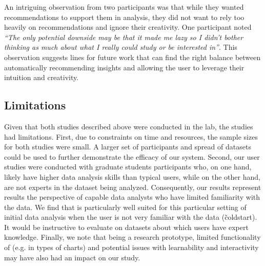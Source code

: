 An intriguing observation from two participants was that while they wanted recommendations to support them
in analysis, they did not want to rely too heavily on recommendations and ignore their creativity.
One participant noted {\em ``The only potential downside may be that it made 
me lazy so I didn't bother thinking as much about what I really could study or be interested in''}.
This observation suggests lines for future work that can find the right balance between automatically 
recommending insights and allowing the user to leverage their intuition and creativity.

\subsection{Limitations}
Given that both studies described above were conducted in the lab, the studies had limitations.
First, due to constraints on time and resources, the sample sizes for both studies were small.
A larger set of participants and spread of datasets could be used to further demonstrate the
efficacy of our system.
Second, our user studies were conducted with graduate students participants who, on one hand, 
likely have higher data analysis skills than typical users, while on the other hand, are 
not experts in the dataset being analyzed.
Consequently, our results represent results the perspective of capable data analysts who 
have limited familiarity with the data.
We find that \SeeDB is particularly well suited for this particular setting of initial data 
analysis when the user is not very familiar with the data (\~ coldstart).
It would be instructive to evaluate \SeeDB on datasets about which users have expert knowledge.
Finally, we note that being a research prototype, limited functionality of \SeeDB (e.g. in types of
charts) and potential issues with learnability and interactivity may have also had an impact on
our study.








